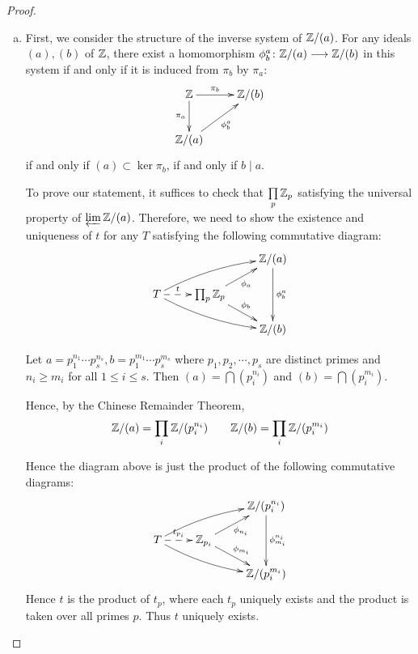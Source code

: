 \begin{proof}
\begin{enumerate}[a)]
      \item First, we consider the structure of the inverse system of ${\mathbb Z}/(a)$.
               For any ideals $(a),(b)$ of ${\mathbb Z}$, there exist a homomorphism $\phi^a_b\colon{\mathbb Z}/(a)\longrightarrow{\mathbb Z}/(b)$ in this system if and only if it is induced from $\pi_b$ by $\pi_a$:
        \begin{displaymath}
          \xymatrix{
             \ZZ\ar[r]^-{\pi_b}\ar[d]_-{\pi_a} & \ZZ/(b)            \\
             \ZZ/(a)\ar[ur]_{\phi^a_b} & }
        \end{displaymath}
               if and only if $(a)\subset\ker\pi_b$, if and only if $b\mid a$.

               To prove our statement, it suffices to check that $\prod\limits_p {\mathbb Z}_p$ satisfying the universal property of $\operatorname*{\underleftarrow{\lim}} {\mathbb Z}/(a)$. Therefore, we need to show the existence and uniqueness of $t$ for any $T$ satisfying the following commutative diagram:
        \begin{displaymath}
          \xymatrix@R=0.5cm{
               & &         \ZZ/(a)\ar[dd]^{\phi^a_b}     \\
            T\ar@/^/[urr]\ar@/_/[drr]\ar@{-->}[r]^-{t}
               & \prod_p\ZZ_p \ar[ur]_{\phi_a} \ar[dr]^{\phi_b}                 \\
               & &         \ZZ/(b)                 }
        \end{displaymath}

               Let $a=p_1^{n_1}\cdots p_s^{n_s}, b=p_1^{m_1}\cdots p_s^{m_s}$ where $p_1,p_2,\cdots,p_s$ are distinct primes and $n_i\geqslant m_i$ for all $1\leqslant i\leqslant s$.
               Then $(a)=\bigcap(p_i^{n_i})$ and $(b)=\bigcap(p_i^{m_i})$.

               Hence, by the Chinese Remainder Theorem,
               \begin{equation*}
                 {\mathbb Z}/(a)=\prod_{i}{\mathbb Z}/(p_i^{n_i}) \qquad {\mathbb Z}/(b)=\prod_{i}{\mathbb Z}/(p_i^{m_i})
               \end{equation*}

               Hence the diagram above is just the product of the following commutative diagrams:
        \begin{displaymath}
          \xymatrix@R=0.5cm{
               & &         \ZZ/(p_i^{n_i})\ar[dd]^{\phi^{n_i}_{m_i}}     \\
            T\ar@/^/[urr]\ar@/_/[drr]\ar@{-->}[r]^-{t_{p_i}}
               & \ZZ_{p_i} \ar[ur]_{\phi_{n_i}} \ar[dr]^{\phi_{m_i}}                 \\
               & &         \ZZ/(p_i^{m_i})                 }
        \end{displaymath}
               Hence $t$ is the product of $t_p$, where each $t_p$ uniquely exists and the product is taken over all primes $p$. Thus $t$ uniquely exists.
    \end{enumerate}
  \end{proof}

